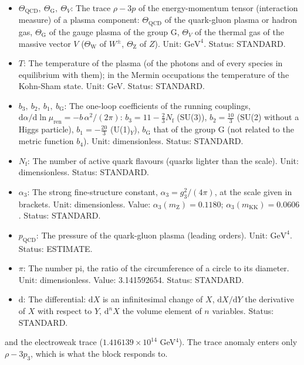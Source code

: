 \documentclass[
  10pt,
]{article}
\providecommand{\tightlist}{%
  \setlength{\itemsep}{0pt}\setlength{\parskip}{0pt}}
\begin{document}
\begin{itemize}
\tightlist
\item
  \(\Theta_{\mathrm{QCD}},\ \Theta_{\mathrm{G}},\ \Theta_V\): The trace
  \(\rho - 3p\) of the energy-momentum tensor (interaction measure) of a
  plasma component: \(\Theta_{\mathrm{QCD}}\) of the quark-gluon plasma
  or hadron gas, \(\Theta_{\mathrm{G}}\) of the gauge plasma of the
  group G, \(\Theta_V\) of the thermal gas of the massive vector \(V\)
  (\(\Theta_{\mathrm{W}}\) of \(W^\pm\), \(\Theta_{\mathrm{Z}}\) of
  \(Z\)). Unit: \(\mathrm{GeV}^{4}\). Status: STANDARD.
\item
  \(T\): The temperature of the plasma (of the photons and of every
  species in equilibrium with them); in the Mermin occupations the
  temperature of the Kohn-Sham state. Unit: GeV. Status: STANDARD.
\item
  \(b_3,\ b_2,\ b_1,\ b_{\mathrm{G}}\): The one-loop coefficients of the
  running couplings,
  \(\mathrm{d}\alpha/\mathrm{d}\ln\mu_{\mathrm{ren}} = -b\,\alpha^2/(2\pi)\):
  \(b_3 = 11 - \frac23N_{\mathrm{f}}\) (SU(3)), \(b_2 = \frac{10}{3}\)
  (SU(2) without a Higgs particle), \(b_1 = -\frac{20}{3}\)
  (U(1)\(_Y\)), \(b_{\mathrm{G}}\) that of the group G (not related to
  the metric function \(b_4\)). Unit: dimensionless. Status: STANDARD.
\item
  \(N_{\mathrm{f}}\): The number of active quark flavours (quarks
  lighter than the scale). Unit: dimensionless. Status: STANDARD.
\item
  \(\alpha_3\): The strong fine-structure constant,
  \(\alpha_3 = g_3^2/(4\pi)\), at the scale given in brackets. Unit:
  dimensionless. Value: \(\alpha_3(m_{\mathrm{Z}}) = 0.1180\);
  \(\alpha_3(m_{\mathrm{KK}}) = 0.0606\). Status: STANDARD.
\item
  \(p_{\mathrm{QCD}}\): The pressure of the quark-gluon plasma (leading
  orders). Unit: \(\mathrm{GeV}^{4}\). Status: ESTIMATE.
\item
  \(\pi\): The number pi, the ratio of the circumference of a circle to
  its diameter. Unit: dimensionless. Value: 3.141592654. Status:
  STANDARD.
\item
  \(\mathrm{d}\): The differential: \(\mathrm{d}X\) is an infinitesimal
  change of \(X\), \(\mathrm{d}X/\mathrm{d}Y\) the derivative of \(X\)
  with respect to \(Y\), \(\mathrm{d}^nX\) the volume element of \(n\)
  variables. Status: STANDARD.
\end{itemize}

and the electroweak trace (\(1.416139\times10^{14}\) GeV\(^4\)). The
trace anomaly enters only \(\rho - 3p_3\), which is what the block
responds to.
\end{document}
